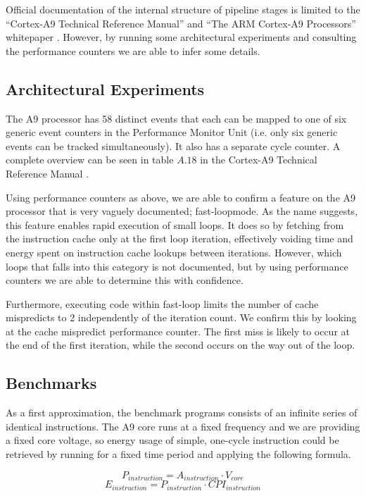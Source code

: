 Official documentation of the internal structure of pipeline stages is limited
to the ``Cortex-A9 Technical Reference Manual'' \cite{armtech} and ``The ARM
Cortex-A9 Processors'' whitepaper \cite{a9whitepaper}. However, by running some
architectural experiments and consulting the performance counters we are able to
infer some details.

\subsection{Architectural Experiments}
\label{arch_experiments}
The A9 processor has 58 distinct events that each can be mapped to one of six
generic event counters in the Performance Monitor Unit (i.e. only six generic
events can be tracked simultaneously). It also has a separate cycle counter. A
complete overview can be seen in table $A.18$ in the Cortex-A9 Technical
Reference Manual \cite{armtech}.

Using performance counters as above, we are able to confirm a feature on the A9
processor that is very vaguely documented; fast-loop\texttrademark mode. As the
name suggests, this feature enables rapid execution of small loops. It does so
by fetching from the instruction cache only at the first loop iteration,
effectively voiding time and energy spent on instruction cache lookups between
iterations. However, which loops that falls into this category is not
documented, but by using performance counters we are able to determine this with
confidence.

Furthermore, executing code within fast-loop limits the number of cache
mispredicts to 2 independently of the iteration count. We confirm this by
looking at the cache mispredict  performance counter. The
first miss is likely to occur at the end of the first iteration, while the
second occurs on the way out of the loop.

\subsection{Benchmarks}
As a first approximation, the benchmark programs consists of an infinite series
of identical instructions. The A9 core runs at a fixed frequency and we are
providing a fixed core voltage, so energy usage of simple, one-cycle instruction
could be retrieved by running for a fixed time period and applying the following
formula.

\begin{equation}
    P_{instruction} = A_{instruction} \cdot V_{core}
\end{equation}
\begin{equation}
    E_{instruction} = P_{instruction} \cdot CPI_{instruction}
\end{equation}



